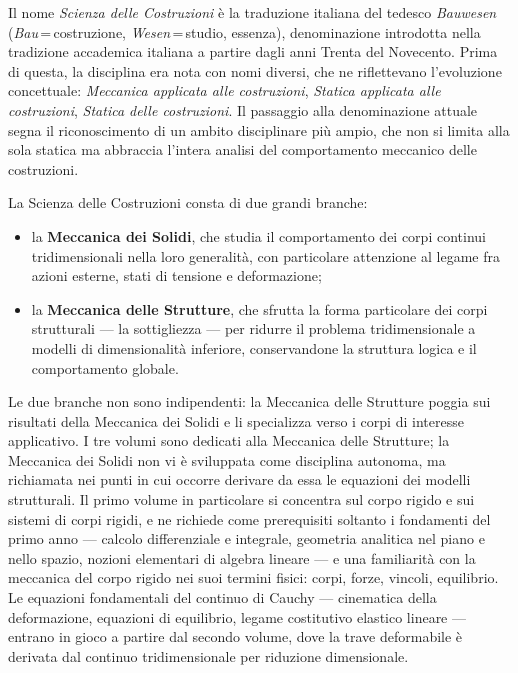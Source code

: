 Il nome \textit{Scienza delle Costruzioni} è la traduzione italiana del tedesco  \textit{Bauwesen} (\textit{Bau}\,=\,costruzione, \textit{Wesen}\,=\,studio, essenza), denominazione introdotta nella tradizione accademica italiana a partire dagli anni Trenta del Novecento. Prima di questa, la disciplina era nota con nomi diversi, che ne riflettevano l'evoluzione concettuale: \textit{Meccanica applicata alle costruzioni}, \textit{Statica applicata alle costruzioni}, \textit{Statica delle costruzioni}. Il passaggio alla denominazione attuale segna il riconoscimento di un ambito disciplinare più ampio, che non si limita alla sola statica ma abbraccia l'intera analisi del comportamento meccanico delle costruzioni.

La Scienza delle Costruzioni consta di due grandi branche:
\begin{itemize}[nosep]
	\item la \textbf{Meccanica dei Solidi}, che studia il comportamento dei corpi continui tridimensionali nella loro generalità, con particolare attenzione al legame fra azioni esterne, stati di tensione e deformazione;
	\item la \textbf{Meccanica delle Strutture}, che sfrutta la forma particolare dei corpi strutturali --- la sottigliezza --- per ridurre il problema tridimensionale a modelli di dimensionalità inferiore, conservandone la struttura logica e il comportamento globale.
\end{itemize}

Le due branche non sono indipendenti: la Meccanica delle Strutture poggia sui risultati della Meccanica dei Solidi e li specializza verso i corpi di interesse applicativo. I tre volumi sono dedicati alla Meccanica delle Strutture; la Meccanica dei Solidi non vi è sviluppata come disciplina autonoma, ma richiamata nei punti in cui occorre derivare da essa le equazioni dei modelli strutturali. Il primo volume in particolare si concentra sul corpo rigido e sui sistemi di corpi rigidi, e ne richiede come prerequisiti soltanto i fondamenti del primo anno --- calcolo differenziale e integrale, geometria analitica nel piano e nello spazio, nozioni elementari di algebra lineare --- e una familiarità con la meccanica del corpo rigido nei suoi termini fisici: corpi, forze, vincoli, equilibrio. Le equazioni fondamentali del continuo di Cauchy --- cinematica della deformazione, equazioni di equilibrio, legame costitutivo elastico lineare --- entrano in gioco a partire dal secondo volume, dove la trave deformabile è derivata dal continuo tridimensionale per riduzione dimensionale.

